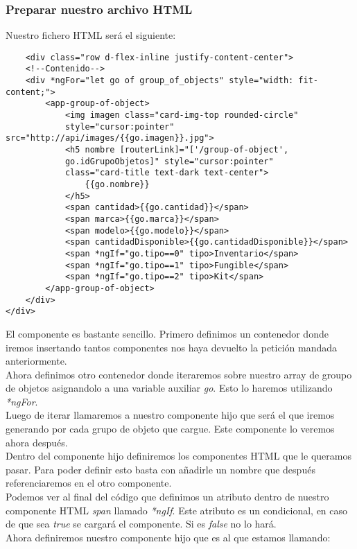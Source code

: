 \subsubsection{Preparar nuestro archivo HTML}
Nuestro fichero HTML será el siguiente:
\begin{verbatim}
    <div class="row d-flex-inline justify-content-center">
    <!--Contenido-->
    <div *ngFor="let go of group_of_objects" style="width: fit-content;">
        <app-group-of-object>
            <img imagen class="card-img-top rounded-circle" 
            style="cursor:pointer" src="http://api/images/{{go.imagen}}.jpg">
            <h5 nombre [routerLink]="['/group-of-object', 
            go.idGrupoObjetos]" style="cursor:pointer"
            class="card-title text-dark text-center">
                {{go.nombre}}
            </h5>
            <span cantidad>{{go.cantidad}}</span>
            <span marca>{{go.marca}}</span>
            <span modelo>{{go.modelo}}</span>
            <span cantidadDisponible>{{go.cantidadDisponible}}</span>
            <span *ngIf="go.tipo==0" tipo>Inventario</span>
            <span *ngIf="go.tipo==1" tipo>Fungible</span>
            <span *ngIf="go.tipo==2" tipo>Kit</span>
        </app-group-of-object>
    </div>
</div>
\end{verbatim}
El componente es bastante sencillo. Primero definimos un contenedor donde iremos insertando tantos componentes nos haya devuelto la petición mandada anteriormente.
\\Ahora definimos otro contenedor donde iteraremos sobre nuestro array de groupo de objetos asignandolo a una variable auxiliar \textit{go}. Esto lo haremos utilizando \textit{*ngFor}.
\\Luego de iterar llamaremos a nuestro componente hijo que será el que iremos generando por cada grupo de objeto que cargue. Este componente lo veremos ahora después.
\\Dentro del componente hijo definiremos los componentes HTML que le queramos pasar. Para poder definir esto basta con añadirle un nombre que después referenciaremos en el otro componente.
\\Podemos ver al final del código que definimos un atributo dentro de nuestro componente HTML \textit{span} llamado \textit{*ngIf}. Este atributo es un condicional, en caso de que sea \textit{true} se cargará el componente. Si es \textit{false} no lo hará.
\\Ahora definiremos nuestro componente hijo que es al que estamos llamando:

